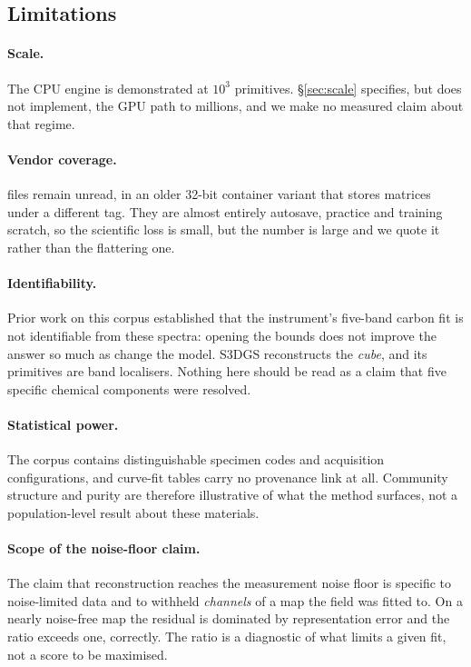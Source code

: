 
\subsection{Limitations}
\label{sec:limitations}

\paragraph{Scale.}
The CPU engine is demonstrated at $10^3$ primitives.
\S\ref{sec:scale} specifies, but does not implement, the GPU path to millions,
and we make no measured claim about that regime.

\paragraph{Vendor coverage.}
\Nlsixfail{} files remain unread, in an older 32-bit container variant that
stores matrices under a different tag. They are almost entirely autosave,
practice and training scratch, so the scientific loss is small, but the number
is large and we quote it rather than the flattering one.

\paragraph{Identifiability.}
Prior work on this corpus established that the instrument's five-band carbon
fit is not identifiable from these spectra: opening the bounds does not improve
the answer so much as change the model. S3DGS reconstructs the \emph{cube}, and
its primitives are band localisers. Nothing here should be read as a claim that
five specific chemical components were resolved.

\paragraph{Statistical power.}
The corpus contains \Nspecimen{} distinguishable specimen codes and
\Nconfig{} acquisition configurations, and \Nfittable{} curve-fit tables carry
no provenance link at all. Community structure and purity are therefore
illustrative of what the method surfaces, not a population-level result about
these materials.

\paragraph{Scope of the noise-floor claim.}
The claim that reconstruction reaches the measurement noise floor is specific
to noise-limited data and to withheld \emph{channels} of a map the field was
fitted to. On a nearly noise-free map the residual is dominated by
representation error and the ratio exceeds one, correctly. The ratio is a
diagnostic of what limits a given fit, not a score to be maximised.

